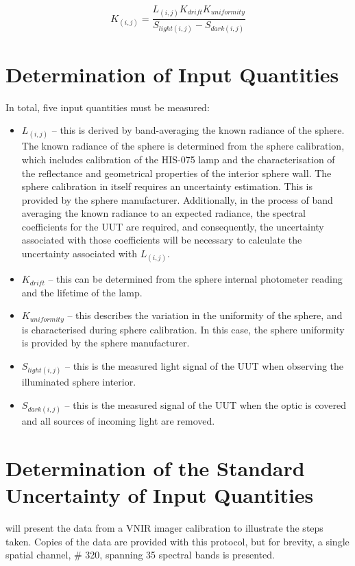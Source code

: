 \documentclass[nohyper,nobib]{tufte-book}
\begin{document}
\begin{equation}
	K_{(i, j)} = \frac{L_{(i,j)}K_{drift}K_{uniformity}}{S_{light(i,j)} - S_{dark(i,j)}}
	\label{eq:measurement}
\end{equation}

\section{Determination of Input Quantities}

In total, five input quantities must be measured:
\begin{itemize}
	\item $L_{(i,j)}$ -- this is derived by band-averaging the known radiance of the sphere. The known radiance of the sphere is determined from the sphere calibration, which includes calibration of the HIS-075 lamp and the characterisation of the reflectance and geometrical properties of the interior sphere wall. The sphere calibration in itself requires an uncertainty estimation. This is provided by the sphere manufacturer. Additionally, in the process of band averaging the known radiance to an expected radiance, the spectral coefficients for the UUT are required, and consequently, the uncertainty associated with those coefficients will be necessary to calculate the uncertainty associated with  $L_{(i,j)}$.
	\item $K_{drift}$ -- this can be determined from the sphere internal photometer reading and the lifetime of the lamp. 
	\item $K_{uniformity}$ -- this describes the variation in the uniformity of the sphere, and is characterised during sphere calibration. In this case, the sphere uniformity is provided by the sphere manufacturer. 
	\item $S_{light(i,j)}$ -- this is the measured light signal of the UUT when observing the illuminated sphere interior. 
	\item $S_{dark(i,j)}$ -- this is the measured signal of the UUT when the optic is covered and all sources of incoming light are removed. 
\end{itemize}

\section{Determination of the Standard Uncertainty of Input Quantities}

 will present the data from a VNIR imager calibration to illustrate the steps taken. Copies of the data are provided with this protocol, but for brevity, a single spatial channel, \# 320, spanning 35 spectral bands is presented. 
\end{document}
